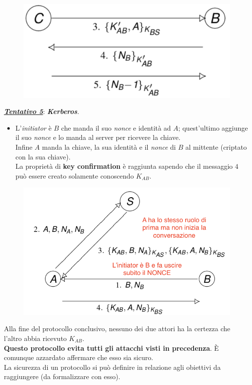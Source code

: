 \documentclass[11pt, a4paper, twoside, italian]{report}
\theoremstyle{plain}
\begin{document}
\begin{multicols}{2}
\begin{figure}[H]
	\end{figure}
	\begin{figure}[H]
		\centering
		\includegraphics[scale=0.55]{problem1attempt4}
	\end{figure}
\end{multicols}

\begin{multicols}{2}
	\noindent
	\textbf{\textit{\underline{Tentativo 5}}}: \textit{\textbf{Kerberos}}.
	\begin{itemize}
		\item L'\textit{initiator} è $B$ che manda il suo \textit{nonce} e identità ad $A$; quest'ultimo aggiunge il suo \textit{nonce} e lo manda al server per ricevere la chiave.\\
		Infine $A$ manda la chiave, la sua identità e il \textit{nonce} di $B$ al mittente (criptato con la sua chiave).\\
		La proprietà di \textbf{key confirmation} è raggiunta sapendo che il messaggio $4$ può essere creato solamente conoscendo $K_{AB}$.
	\end{itemize}
	\columnbreak
	\begin{figure}[H]
		\centering
		\includegraphics[scale=0.5]{attempt5}
	\end{figure}
\end{multicols}
\noindent
Alla fine del protocollo conclusivo, nessuno dei due attori ha la certezza che l'altro abbia ricevuto $K_{AB}$.\\
\textbf{Questo protocollo evita tutti gli attacchi visti in precedenza}. È comunque azzardato affermare che esso sia sicuro.\\
La sicurezza di un protocollo si può definire in relazione agli obiettivi da raggiungere (da formalizzare con esso).
\end{document}
